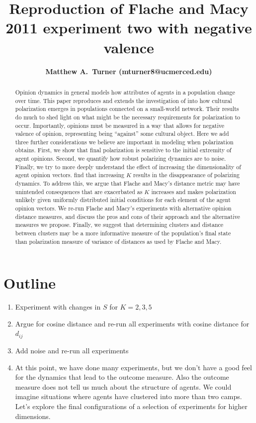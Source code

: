 \documentclass[11pt,letterpaper]{article}
\title{Reproduction of Flache and Macy 2011 experiment two with negative valence}
\author{{\bf Matthew A.~Turner (mturner8@ucmerced.edu)}}
\begin{document}
\maketitle

\begin{abstract}
  Opinion dynamics in general models how attributes of agents in a population
  change over time. This paper reproduces and extends the investigation of
   into how cultural polarization emerges in populations
  connected on a small-world network. Their results do much to shed light
  on what might be the necessary requirements for polarization to occur.
  Importantly, opinions must be measured in a way that allows for negative
  valence of opinion, representing being ``against'' some cultural object.
  Here we add three further considerations we believe are important in 
  modeling when polarization obtains. First, we show that final polarization
  is sensitive to the initial extremity of agent opinions. Second, we quantify
  how robust polarizing dynamics are to noise. Finally, we try to more deeply
  understand the effect of increasing the dimensionality of agent opinion
  vectors.  find that increasing $K$ results in the
  disappearance of polarizing dynamics. To address this, we argue that 
  Flache and Macy's distance metric may have unintended consequences that are
  exacerbated as $K$ increases and makes polarization unlikely given 
  uniformly distributed initial conditions for each element of the agent
  opinion vectors. We re-run Flache and Macy's experiments with
  alternative opinion distance measures, and discuss the pros and cons of their
  approach and the alternative measures we propose. Finally, we suggest that
  determining clusters and distance between clusters may be a more informative
  measure of the population's final state than polarization measure of 
  variance of distances as used by Flache and Macy.
\end{abstract}

\section{Outline}

\begin{enumerate}
  \item Experiment with changes in $S$ for $K=2, 3, 5$
  \item Argue for cosine distance and re-run all experiments with cosine distance for $d_{ij}$
  \item Add noise and re-run all experiments
  \item At this point, we have done many experiments, but we don't have a good
    feel for the dynamics that lead to the outcome measure. Also the outcome
    measure does not tell us much about the structure of agents. We could imagine
    situations where agents have clustered into more than two camps. 
    Let's explore the final configurations of a selection of experiments for
    higher dimensions.
\end{enumerate}
\end{document}
